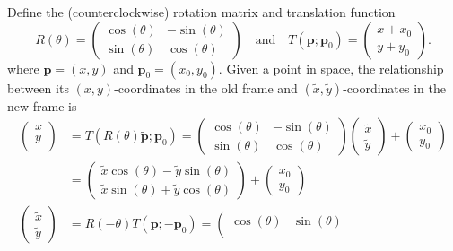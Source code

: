 \documentclass[12pt]{article}
\begin{document}
\begin{enumerate}
	Define the (counterclockwise) rotation matrix and translation function
	\[
		R(\theta) = \left(\begin{array}{cc}
			\cos(\theta) & -\sin(\theta) \\
			\sin(\theta) & \cos(\theta)
		\end{array}\right) \quad \mbox{and} \quad 
		T(\mathbf{p}; \mathbf{p}_0) = \left(\begin{array}{c}
			x + x_0 \\
			y + y_0
		\end{array}\right).
	\]
	where $\mathbf{p} = (x,y)$ and $\mathbf{p}_0 = (x_0,y_0)$. Given a point in space, the relationship between its $(x,y)$-coordinates in the old frame and $(\tilde x, \tilde y)$-coordinates in the new frame is
	\begin{align*}
		\left(\begin{array}{c}
			x \\
			y \\
		\end{array}\right) &= T(R(\theta)\mathbf{\tilde p}; \mathbf{p}_0) 
		= \left(\begin{array}{cc}
		\cos(\theta) & -\sin(\theta) \\
		\sin(\theta) & \cos(\theta)
		\end{array}\right)\left(\begin{array}{c}
			\tilde x \\
			\tilde y
		\end{array}\right) + \left(\begin{array}{c}
			x_0 \\
			y_0
		\end{array}\right) \\
		&= \left(\begin{array}{c}
			\tilde x\cos(\theta) - \tilde y\sin(\theta) \\
			\tilde x\sin(\theta) + \tilde y\cos(\theta)
		\end{array}\right) + \left(\begin{array}{c}
		x_0 \\
		y_0
		\end{array}\right) \\
		\left(\begin{array}{c}
			\tilde x \\
			\tilde y
		\end{array}\right) &= R(-\theta)T(\mathbf{p}; -\mathbf{p}_0)
		= \left(\begin{array}{cc}
		\cos(\theta) & \sin(\theta) \\

\end{array}
\end{align*}
\end{enumerate}
\end{document}
